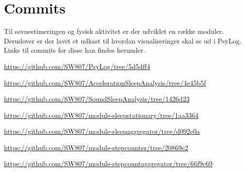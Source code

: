 \chapter{Commits}
Til søvnestimeringen og fysisk aktivitet er der udviklet en række moduler.
Derudover er der lavet et udkast til hvordan visualiseringer skal se ud i PsyLog.
Links til commits for disse kan findes herunder.

\begin{description}[style=nextline]
	\item[PsyLog - Viewbranch] \url{https://github.com/SW807/PsyLog/tree/5d5dff4}
	\item[AccelerationSleepAnalysis] \url{https://github.com/SW807/AccelerationSleepAnalysis/tree/4e45b5f}
	\item[SoundSleepAnalysis] \url{https://github.com/SW807/SoundSleepAnalysis/tree/1426d23}
	\item[module-sleepstationary] \url{https://github.com/SW807/module-sleepstationary/tree/1aa3364}
	\item[module-sleepaggregator] \url{https://github.com/SW807/module-sleepaggregator/tree/d092e0a}
	\item[module-stepcounter] \url{https://github.com/SW807/module-stepcounter/tree/20869e2}
	\item[module-stepcountaggregator] \url{https://github.com/SW807/module-stepcountaggregator/tree/66f9c69}
\end{description}